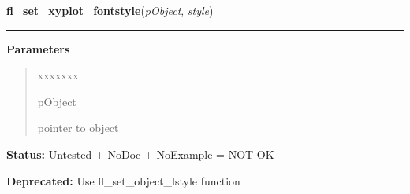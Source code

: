 \hspace{.8\funcindent}\begin{boxedminipage}{\funcwidth}

    \raggedright \textbf{fl\_set\_xyplot\_fontstyle}(\textit{pObject}, \textit{style})

    \vspace{-1.5ex}

    \rule{\textwidth}{0.5\fboxrule}
\setlength{\parskip}{2ex}
\setlength{\parskip}{1ex}
      \textbf{Parameters}
      \vspace{-1ex}

      \begin{quote}
        \begin{Ventry}{xxxxxxx}

          \item[pObject]

          pointer to object

        \end{Ventry}

      \end{quote}

\textbf{Status:} Untested + NoDoc + NoExample = NOT OK



\textbf{Deprecated:} Use fl\_set\_object\_lstyle function



    \end{boxedminipage}

    \label{xformslib:deprecated:fl_set_slider_return}

    \vspace{0.5ex}

